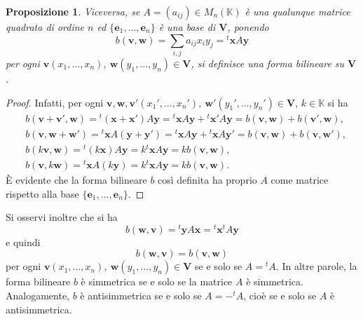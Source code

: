 \documentclass{article}
\theoremstyle{plain}
\newtheorem{prop}[thm]{Proposizione}
\theoremstyle{definition}
\theoremstyle{remark}
\begin{document}
\begin{bxthm}
\begin{prop}
Viceversa, se $A = (a_{ij}) \in M_n(\mathbb{K})$ è una qualunque matrice quadrata di ordine $n$ ed $\{\mathbf{e}_1, \dots, \mathbf{e}_n\}$ è una 
base di $\mathbf{V}$, ponendo
\[
b(\mathbf{v}, \mathbf{w}) = \sum_{i,j} a_{ij} x_i y_j = {}^t\mathbf{x} A \mathbf{y}
\]
per ogni $\mathbf{v}(x_1, \dots, x_n),\ \mathbf{w}(y_1, \dots, y_n) \in \mathbf{V}$, si definisce una forma bilineare su $\mathbf{V}$.
\end{prop}
\end{bxthm}
\begin{proof}
Infatti, per ogni $\mathbf{v}, \mathbf{w}, \mathbf{v}'(x_1', \dots, x_n'),\ \mathbf{w}'(y_1', \dots, y_n') \in \mathbf{V}$, $k \in \mathbb{K}$ si ha
\begin{align*}
&b(\mathbf{v} + \mathbf{v}', \mathbf{w}) = {}^t(\mathbf{x} + \mathbf{x}') A \mathbf{y} = {}^t\mathbf{x} A \mathbf{y} + {}^t\mathbf{x}' A \mathbf{y} = b(\mathbf{v}, \mathbf{w}) + b(\mathbf{v}', \mathbf{w}), \\
&b(\mathbf{v}, \mathbf{w} + \mathbf{w}') = {}^t\mathbf{x} A (\mathbf{y} + \mathbf{y}') = {}^t\mathbf{x} A \mathbf{y} + {}^t\mathbf{x} A \mathbf{y}' = b(\mathbf{v}, \mathbf{w}) + b(\mathbf{v}, \mathbf{w}'), \\
&b(k\mathbf{v}, \mathbf{w}) = {}^t(k \mathbf{x}) A \mathbf{y} = k {}^t\mathbf{x} A \mathbf{y} = k b(\mathbf{v}, \mathbf{w}), \\
&b(\mathbf{v}, k\mathbf{w}) = {}^t\mathbf{x} A (k \mathbf{y}) = k {}^t\mathbf{x} A \mathbf{y} = k b(\mathbf{v}, \mathbf{w}).
\end{align*}    
È evidente che la forma bilineare $b$ così definita ha proprio $A$ come matrice rispetto alla base $\{\mathbf{e}_1, \dots, \mathbf{e}_n\}$.
\end{proof}

\vspace{10pt}

Si osservi inoltre che si ha
\[
b(\mathbf{w}, \mathbf{v}) = {}^t\mathbf{y} A \mathbf{x} = {}^t\mathbf{x} {}^tA \mathbf{y}
\]
e quindi
\[
b(\mathbf{w}, \mathbf{v}) = b(\mathbf{v}, \mathbf{w})
\]
per ogni $\mathbf{v}(x_1, \dots, x_n),\ \mathbf{w}(y_1, \dots, y_n) \in \mathbf{V}$ se e solo se $A = {}^tA$. 
In altre parole, la forma bilineare $b$ è simmetrica se e solo se la matrice $A$ è simmetrica. 
Analogamente, $b$ è antisimmetrica se e solo se $A = -{}^tA$, cioè se e solo se $A$ è antisimmetrica.

\vspace{10pt}
\end{document}
